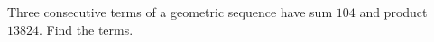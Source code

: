 Three consecutive terms of a geometric sequence have sum $104$ and product $13824$. Find the terms.
